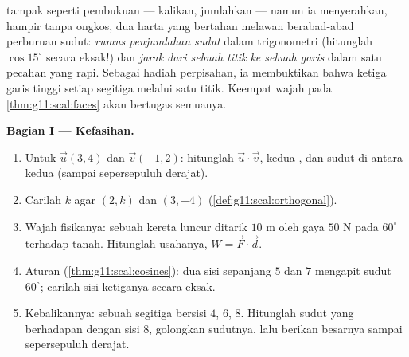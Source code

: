 \begin{problem}
\label{pb:g11:scal:1}
 tampak seperti pembukuan --- kalikan, jumlahkan ---
namun ia menyerahkan, hampir tanpa ongkos, dua harta yang
bertahan melawan berabad-abad perburuan sudut: \emph{rumus penjumlahan sudut}
dalam trigonometri (hitunglah $\cos 15^\circ$ secara eksak!) dan
\emph{jarak dari sebuah titik ke sebuah garis} dalam satu pecahan yang rapi.
Sebagai hadiah perpisahan, ia membuktikan bahwa ketiga garis tinggi setiap
segitiga melalui satu titik. Keempat wajah pada
\cref{thm:g11:scal:faces} akan bertugas semuanya.

\medskip
\noindent\textbf{Bagian I --- Kefasihan.}
\begin{enumerate}
  \item Untuk $\vec u(3, 4)$ dan $\vec v(-1, 2)$: hitunglah
        $\vec u \cdot \vec v$, kedua , dan sudut
        di antara kedua  (sampai sepersepuluh derajat).
  \item Carilah $k$ agar $(2, k)$ dan $(3, -4)$ 
        (\cref{def:g11:scal:orthogonal}).
  \item Wajah fisikanya: sebuah kereta luncur ditarik $10$ m oleh gaya $50$ N
        pada $60^\circ$ terhadap tanah. Hitunglah usahanya,
        $W = \vec F \cdot \vec d$.
  \item Aturan  (\cref{thm:g11:scal:cosines}): dua sisi
        sepanjang $5$ dan $7$ mengapit sudut $60^\circ$; carilah
        sisi ketiganya secara eksak.
  \item Kebalikannya: sebuah segitiga bersisi $4$, $6$, $8$. Hitunglah
         sudut yang berhadapan dengan sisi $8$, golongkan
        sudutnya, lalu berikan besarnya sampai sepersepuluh derajat.
\end{enumerate}


\end{problem}
